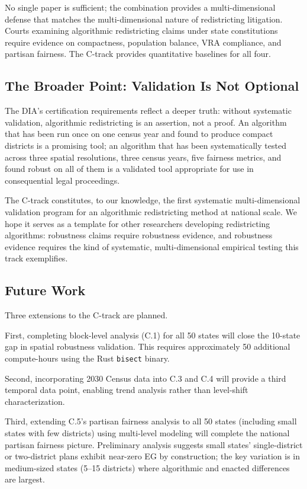 No single paper is sufficient; the combination provides a
multi-dimensional defense that matches the multi-dimensional nature
of redistricting litigation. Courts examining algorithmic redistricting
claims under state constitutions require evidence on compactness,
population balance, VRA compliance, and partisan fairness. The C-track
provides quantitative baselines for all four.

\subsection{The Broader Point: Validation Is Not Optional}

The DIA's certification requirements reflect a deeper truth: without
systematic validation, algorithmic redistricting is an assertion, not
a proof. An algorithm that has been run once on one census year and
found to produce compact districts is a promising tool; an algorithm
that has been systematically tested across three spatial resolutions,
three census years, five fairness metrics, and found robust on all of
them is a validated tool appropriate for use in consequential legal
proceedings.

The C-track constitutes, to our knowledge, the first systematic
multi-dimensional validation program for an algorithmic redistricting
method at national scale. We hope it serves as a template for other
researchers developing redistricting algorithms: robustness claims
require robustness evidence, and robustness evidence requires the kind
of systematic, multi-dimensional empirical testing this track exemplifies.

\subsection{Future Work}

Three extensions to the C-track are planned.

First, completing block-level analysis (C.1) for all 50 states will
close the 10-state gap in spatial robustness validation. This requires
approximately 50 additional compute-hours using the Rust \texttt{bisect}
binary.

Second, incorporating 2030 Census data into C.3 and C.4 will provide
a third temporal data point, enabling trend analysis rather than
level-shift characterization.

Third, extending C.5's partisan fairness analysis to all 50 states
(including small states with few districts) using multi-level modeling
will complete the national partisan fairness picture. Preliminary
analysis suggests small states' single-district or two-district plans
exhibit near-zero EG by construction; the key variation is in
medium-sized states (5--15 districts) where algorithmic and enacted
differences are largest.
